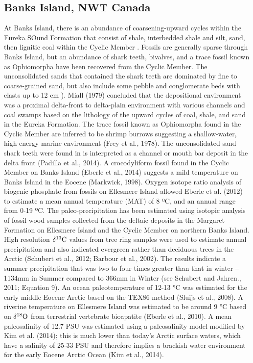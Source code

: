 \documentclass[]{rsos}%
\begin{document}
\subsection{Banks Island, NWT Canada}
At Banks Island, there is an abundance of coarsening-upward cycles within the Eureka SOund Formation that consist of shale, interbedded shale and silt, sand, then lignitic coal within the Cyclic Member \cite{Padilla2014}. 
Fossils are generally sparse through Banks Island, but an abundance of shark teeth, bivalves, and a trace fossil known as Ophiomorpha \cite{Miall1979, Padilla2014} have been recovered from the Cyclic Member. 
The unconsolidated sands that contained the shark teeth are dominated by fine to coarse-grained sand, but also include some pebble and conglomerate beds with clasts up to 12 cm \cite{Miall1979}). 
Miall (1979) concluded that the depositional environment was a proximal delta-front to delta-plain environment with various channels and coal swamps based on the lithology of the upward cycles of coal, shale, and sand in the Eureka Formation. 
The trace fossil known as Ophiomorpha found in the Cyclic Member \cite{Miall1979, Eberle2012} are inferred to be shrimp burrows suggesting a shallow-water, high-energy marine environment (Frey et al., 1978). 
The unconsolidated sand shark teeth were found in is interpreted as a channel or mouth bar deposit in the delta front (Padilla et al., 2014). 
A crocodyliform fossil found in the Cyclic Member on Banks Island (Eberle et al., 2014) suggests a mild temperature on Banks Island in the Eocene (Markwick, 1998). 
Oxygen isotope ratio analysis of biogenic phosphate from fossils on Ellesmere Island allowed Eberle et al. (2012) to estimate a mean annual temperature (MAT) of 8 ºC, and an annual range from 0-19 ºC. 
The paleo-precipitation has been estimated using isotopic analysis of fossil wood samples collected from the deltaic deposits in the Margaret Formation on Ellesmere Island and the Cyclic Member on northern Banks Island. High resolution $\delta^{13}{\rm C}$ values from tree ring samples were used to estimate annual precipitation and also indicated evergreen rather than deciduous trees in the Arctic (Schubert et al., 2012; Barbour et al., 2002). 
The results indicate a summer precipitation that was two to four times greater than that in winter – 1134mm in Summer compared to 366mm in Winter (see Schubert and Jahren., 2011; Equation 9). 
An ocean paleotemperature of 12-13 °C was estimated for the early-middle Eocene Arctic based on the TEX86 method (Sluijs et al., 2008). 
A riverine temperature on Ellesmere Island was estimated to be around 9 °C based on $\delta^{18}{\rm O}$ from terrestrial vertebrate bioapatite (Eberle et al., 2010). 
A mean paleosalinity of 12.7 PSU was estimated using a paleosalinity model modified by Kim et al. (2014); this is much lower than today’s Arctic surface waters, which have a salinity of 25-33 PSU and therefore implies a brackish water environment for the early Eocene Arctic Ocean (Kim et al., 2014).
\end{document}
